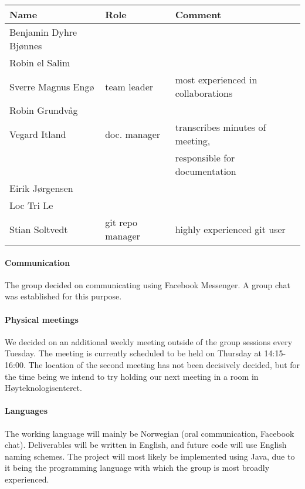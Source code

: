 \documentclass{article}
\begin{document}
\begin{tabular}{l l l}
    Name                       & Role              & Comment \\
    \hline
    Benjamin Dyhre Bjønnes     &                   & \\
    Robin el Salim             &                   & \\
    Sverre Magnus Engø         & team leader       & most experienced in collaborations \\
    Robin Grundvåg             &                   & \\
    Vegard Itland              & doc. manager      & transcribes minutes of meeting, \\
                               &                   & responsible for documentation \\
    Eirik Jørgensen            &                   & \\
    Loc Tri Le                 &                   & \\
    Stian Soltvedt             & git repo manager  & highly experienced git user
\end{tabular}

\newpage
\paragraph{Communication}

The group decided on communicating using Facebook Messenger. A group chat was established for this purpose.

\paragraph{Physical meetings}

We decided on an additional weekly meeting outside of the group sessions every Tuesday. The meeting is currently scheduled to be held on Thursday at 14:15-16:00. The location of the second meeting has not been decisively decided, but for the time being we intend to try holding our next meeting in a room in Høyteknologisenteret.

\paragraph{Languages}

The working language will mainly be Norwegian (oral communication, Facebook chat). Deliverables will be written in English, and future code will use English naming schemes. The project will most likely be implemented using Java, due to it being the programming language with which the group is most broadly experienced.
\end{document}
